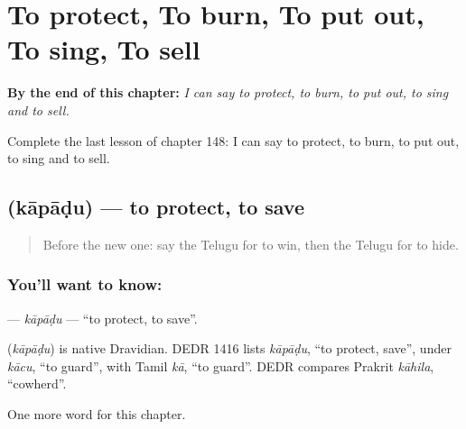 
\chapter{To protect, To burn, To put out, To sing, To sell}
\label{ch:te-to-protect-to-burn-to-put-out-to-sing-to-sell}

\begin{chapteropening}
\textbf{By the end of this chapter:} \emph{I can say to protect, to burn, to put out, to sing and to sell.}

Complete the last lesson of chapter 148: I can say to protect, to burn, to put out, to sing and to sell.
\end{chapteropening}

\section[\texorpdfstring{\te{కాపాడు} (kāpāḍu)}{కాపాడు (kāpāḍu)}]{ (kāpāḍu) — to protect, to save}

\label{lesson:TE-C148-kapadu}



\begin{quote}
Before the new one: say the Telugu for to win, then the Telugu for to hide.
\end{quote}

\subsection*{You'll want to know: }
\textbf{} — \emph{kāpāḍu} — \textquotedblleft{}to protect, to save\textquotedblright{}.

\begin{cousinweb}
\textbf{} (\emph{kāpāḍu}) is native Dravidian. DEDR 1416 lists \emph{kāpāḍu}, \textquotedblleft{}to protect, save\textquotedblright{}, under \emph{kācu}, \textquotedblleft{}to guard\textquotedblright{}, with Tamil \emph{kā}, \textquotedblleft{}to guard\textquotedblright{}. DEDR compares Prakrit \emph{kāhila}, \textquotedblleft{}cowherd\textquotedblright{}.
\end{cousinweb}

\begin{grammarlens}[title={What you've built}]
One more word for this chapter.
\end{grammarlens}

